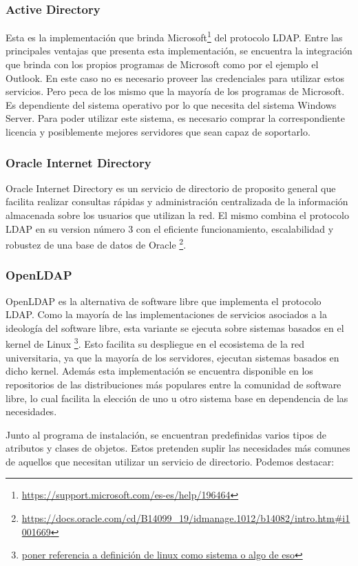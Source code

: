 \subsubsection{Active Directory}
Esta es la implementación que brinda Microsoft\footnote{\url{https://support.microsoft.com/es-es/help/196464}}
del protocolo LDAP. Entre las principales ventajas que presenta esta implementación, se encuentra
la integración que brinda con los propios programas de Microsoft como por el ejemplo el 
Outlook. En este caso no es necesario proveer las credenciales para utilizar estos servicios.
Pero peca de los mismo que la mayoría de los programas de Microsoft. Es dependiente del sistema
operativo por lo que necesita del sistema Windows Server. Para poder utilizar este sistema,
es necesario comprar la correspondiente licencia y posiblemente mejores servidores que sean capaz
de soportarlo.
\subsubsection{Oracle Internet Directory}
Oracle Internet Directory es un servicio de directorio de proposito general que facilita realizar
consultas rápidas y administración centralizada de la información almacenada sobre los usuarios
que utilizan la red. El mismo combina el protocolo LDAP en su version número 3 con el eficiente
funcionamiento, escalabilidad y robustez de una base de datos de Oracle \footnote{ 
\url{https://docs.oracle.com/cd/B14099\_19/idmanage.1012/b14082/intro.htm\#i1001669}}.

\newpage


\subsubsection{OpenLDAP}
OpenLDAP es la alternativa de software libre que implementa el protocolo LDAP. Como la mayoría de
las implementaciones de servicios asociados a la ideología del software libre, esta variante se
ejecuta sobre sistemas basados en el kernel de Linux \footnote{\url{poner referencia a definición
de linux como sistema o algo de eso}}. Esto facilita su despliegue en el ecosistema de la red
universitaria, ya que la mayoría de los servidores, ejecutan sistemas basados en dicho kernel.
Además esta implementación se encuentra disponible en los repositorios de las distribuciones más
populares entre la comunidad de software libre, lo cual facilita la elección de uno u otro 
sistema base en dependencia de las necesidades.

Junto al programa de instalación, se encuentran predefinidas varios tipos de atributos y 
clases de objetos. Estos  pretenden suplir las necesidades más comunes de aquellos que 
necesitan utilizar un servicio de directorio. Podemos destacar:

